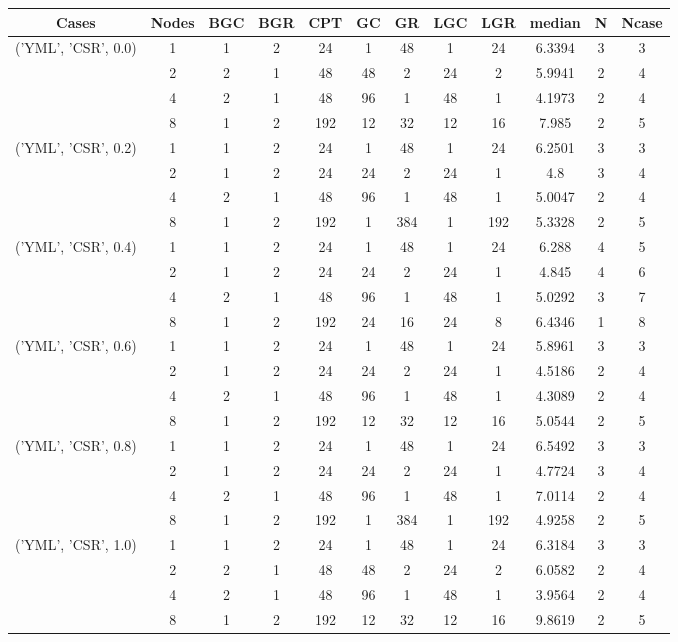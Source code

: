 \begin{tabular}{cccccccccccc}
\hline
Cases & Nodes& BGC& BGR& CPT& GC& GR& LGC& LGR& median & N & Ncase \\
\hline
\multirow{4}{*}{('YML', 'CSR', 0.0)}& 1& 1& 2& 24& 1& 48& 1& 24& 6.3394& 3& 3\\
& 2& 2& 1& 48& 48& 2& 24& 2& 5.9941& 2& 4\\
& 4& 2& 1& 48& 96& 1& 48& 1& 4.1973& 2& 4\\
& 8& 1& 2& 192& 12& 32& 12& 16& 7.985& 2& 5\\
\hline
\multirow{4}{*}{('YML', 'CSR', 0.2)}& 1& 1& 2& 24& 1& 48& 1& 24& 6.2501& 3& 3\\
& 2& 1& 2& 24& 24& 2& 24& 1& 4.8& 3& 4\\
& 4& 2& 1& 48& 96& 1& 48& 1& 5.0047& 2& 4\\
& 8& 1& 2& 192& 1& 384& 1& 192& 5.3328& 2& 5\\
\hline
\multirow{4}{*}{('YML', 'CSR', 0.4)}& 1& 1& 2& 24& 1& 48& 1& 24& 6.288& 4& 5\\
& 2& 1& 2& 24& 24& 2& 24& 1& 4.845& 4& 6\\
& 4& 2& 1& 48& 96& 1& 48& 1& 5.0292& 3& 7\\
& 8& 1& 2& 192& 24& 16& 24& 8& 6.4346& 1& 8\\
\hline
\multirow{4}{*}{('YML', 'CSR', 0.6)}& 1& 1& 2& 24& 1& 48& 1& 24& 5.8961& 3& 3\\
& 2& 1& 2& 24& 24& 2& 24& 1& 4.5186& 2& 4\\
& 4& 2& 1& 48& 96& 1& 48& 1& 4.3089& 2& 4\\
& 8& 1& 2& 192& 12& 32& 12& 16& 5.0544& 2& 5\\
\hline
\multirow{4}{*}{('YML', 'CSR', 0.8)}& 1& 1& 2& 24& 1& 48& 1& 24& 6.5492& 3& 3\\
& 2& 1& 2& 24& 24& 2& 24& 1& 4.7724& 3& 4\\
& 4& 2& 1& 48& 96& 1& 48& 1& 7.0114& 2& 4\\
& 8& 1& 2& 192& 1& 384& 1& 192& 4.9258& 2& 5\\
\hline
\multirow{4}{*}{('YML', 'CSR', 1.0)}& 1& 1& 2& 24& 1& 48& 1& 24& 6.3184& 3& 3\\
& 2& 2& 1& 48& 48& 2& 24& 2& 6.0582& 2& 4\\
& 4& 2& 1& 48& 96& 1& 48& 1& 3.9564& 2& 4\\
& 8& 1& 2& 192& 12& 32& 12& 16& 9.8619& 2& 5\\
\hline
\end{tabular}



